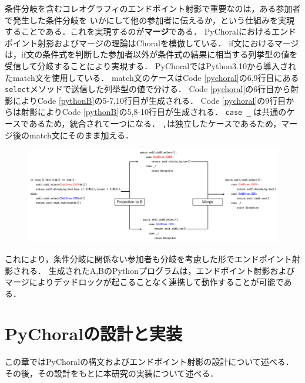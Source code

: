 \documentclass{thesis}
\begin{document}
条件分岐を含むコレオグラフィのエンドポイント射影で重要なのは，ある参加者で発生した条件分岐を
いかにして他の参加者に伝えるか，という仕組みを実現することである．これを実現するのが\textbf{マージ}である．
PyChoralにおけるエンドポイント射影およびマージの理論はChoralを模倣している．
if文におけるマージは，if文の条件式を判断した参加者以外が条件式の結果に相当する列挙型の値を受信して分岐することにより実現する．
PyChoralではPython3.10から導入されたmatch文を使用している．
match文のケースはCode \ref{pychoral}の6,9行目にある\texttt{select}メソッドで送信した列挙型の値で分ける．
Code \ref{pychoral}の6行目から射影によりCode \ref{pythonB}の5-7,10行目が生成される．
Code \ref{pychoral}の9行目からは射影によりCode \ref{pythonB}の5,8-10行目が生成される．
\texttt{case \_} は共通のケースであるため，統合されて一つになる．
\texttt{{\color{red}{OddEven.EVEN}},{\color{blue}{OddEven.ODD}}}は独立したケースであるため，マージ後のmatch文にそのまま加える．
\begin{figure}[H]
  \centering
  \includegraphics[scale=0.413]{image/merge.png}
\end{figure}

これにより，条件分岐に関係ない参加者も分岐を考慮した形でエンドポイント射影される．
生成されたA,BのPythonプログラムは，エンドポイント射影およびマージによりデッドロックが起こることなく連携して動作することが可能である．
\chapter{PyChoralの設計と実装}
この章ではPyChoralの構文およびエンドポイント射影の設計について述べる．その後，その設計をもとに本研究の実装について述べる．
\end{document}
